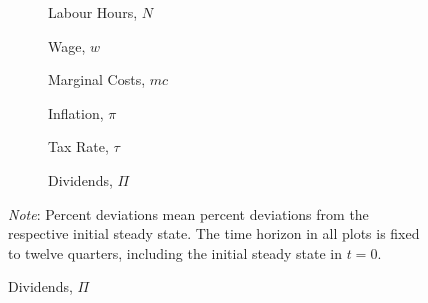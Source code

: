 \documentclass[a4paper,12pt]{article} %
\numberwithin{equation}{section} %
\numberwithin{figure}{section}
\numberwithin{table}{section}
\begin{document}
\begin{refsection}
\begin{appendices}
\begin{figure}[H]
    \caption{Supplement for Figure \ref{fig:baseline-permanent-limit-agg}}%
    \label{fig:baseline-permanent-limit-agg-extra}
    \begin{subfigure}[b]{0.49\textwidth}
     \caption{Labour Hours, $N$}
     \label{fig:baseline-permanent-limit-agg-N}
         \centering
         
     \end{subfigure}
     \hfill
     \begin{subfigure}[b]{0.49\textwidth}
     \caption{Wage, $w$}
     \label{fig:baseline-permanent-limit-agg-w}
         \centering
         
     \end{subfigure}
     \hfill
     \begin{subfigure}[b]{0.49\textwidth}
     \centering
     \caption{Marginal Costs, $mc$}
     \label{fig:baseline-permanent-limit-agg-mc}
         
     \end{subfigure}
     \hfill
     \begin{subfigure}[b]{0.49\textwidth}
     \centering
     \caption{Inflation, $\pi$}
     \label{fig:baseline-permanent-limit-agg-pi}
         
     \end{subfigure}
     \hfill
    \begin{subfigure}[b]{0.49\textwidth}
    \caption{Tax Rate, $\tau$}
    \label{fig:baseline-permanent-limit-agg-tau}
         \centering
         
     \end{subfigure}
     \hfill
     \begin{subfigure}[b]{0.49\textwidth}
     \caption{Dividends, $\Pi$}
     \label{fig:baseline-permanent-limit-agg-Pi}
         \centering
         
     \end{subfigure}

    \vspace{10pt}
     
     \begin{flushleft}
     \footnotesize
	\textit{Note}: Percent deviations mean percent deviations from the respective initial steady state. The time horizon in all plots is fixed to twelve quarters, including the initial steady state in $t=0$.
	\end{flushleft}
\end{figure}


\end{appendices}
\end{refsection}
\end{document}

